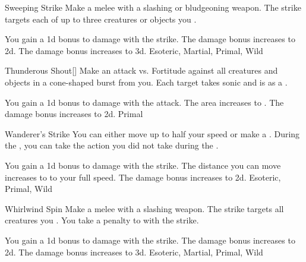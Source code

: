 \lowercase{\hypertarget{maneuver:Sweeping Strike}{}}\label{maneuver:Sweeping Strike}
\hypertarget{maneuver:Sweeping Strike}{}
\begin{apability}{Sweeping Strike}
Make a melee  with a slashing or bludgeoning weapon.
The strike targets each of up to three creatures or objects you .

\rankline
{} You gain a \plus1d bonus to damage with the strike.
 The damage bonus increases to \plus2d.
 The damage bonus increases to \plus3d.
 Esoteric, Martial, Primal, Wild
\end{apability}
\vspace{0.25em}



\lowercase{\hypertarget{maneuver:Thunderous Shout}{}}\label{maneuver:Thunderous Shout}
\hypertarget{maneuver:Thunderous Shout}{}
\begin{apability}{Thunderous Shout}[]
Make an attack vs. Fortitude against all creatures and objects in a \areamed cone-shaped burst from you.
\hit Each target takes sonic  and is  as a .

\rankline
{} You gain a \plus1d bonus to damage with the attack.
 The area increases to \arealarge.
 The damage bonus increases to \plus2d.
 Primal
\end{apability}
\vspace{0.25em}



\lowercase{\hypertarget{maneuver:Wanderer's Strike}{}}\label{maneuver:Wanderer's Strike}
\hypertarget{maneuver:Wanderer's Strike}{}
\begin{freeability}{Wanderer's Strike}
You can either move up to half your speed or make a .
During the , you can take the action you did not take during the .

\rankline
{} You gain a \plus1d bonus to damage with the strike.
 The distance you can move increases to to your full speed.
 The damage bonus increases to \plus2d.
 Esoteric, Primal, Wild
\end{freeability}
\vspace{0.25em}



\lowercase{\hypertarget{maneuver:Whirlwind Spin}{}}\label{maneuver:Whirlwind Spin}
\hypertarget{maneuver:Whirlwind Spin}{}
\begin{apability}{Whirlwind Spin}
Make a melee  with a slashing weapon.
The strike targets all creatures you .
You take a  penalty to  with the strike.

\rankline
{} You gain a \plus1d bonus to damage with the strike.
 The damage bonus increases to \plus2d.
 The damage bonus increases to \plus3d.
 Esoteric, Martial, Primal, Wild
\end{apability}
\vspace{0.25em}

